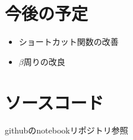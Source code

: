 \documentclass[twocolumn]{jarticle}     %
\begin{document}
\section{今後の予定}

\begin{itemize}
  \item ショートカット関数の改善
  \item $\beta$周りの改良
\end{itemize}

\section{ソースコード}
githubのnotebookリポジトリ参照



\end{document}
